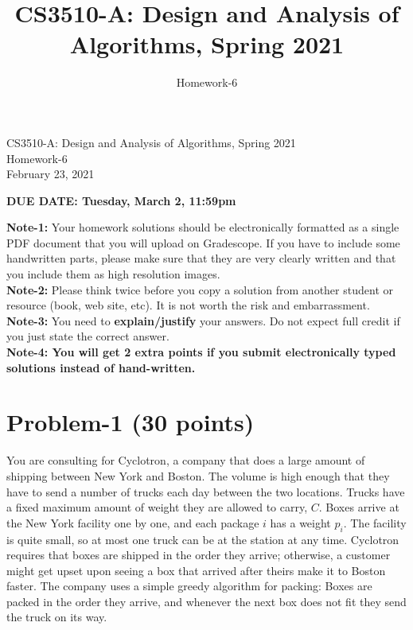 \documentclass[11pt]{article}
\title{CS3510-A: Design and Analysis of Algorithms, Spring 2021}
\author{Homework-6}
\begin{document}
\begin{center}
    \LARGE CS3510-A: Design and Analysis of Algorithms, Spring 2021 \\ \vspace{1em} 
    \large Homework-6 \\ \vspace{0.5em}
    February 23, 2021
\end{center}
\thispagestyle{empty}
\pagestyle{empty}

\noindent
\begin{center}
{\bf DUE DATE: Tuesday, March 2, 11:59pm}
\end{center}

\noindent
{\bf Note-1:} Your homework solutions should be electronically formatted as a single PDF document that you will upload on Gradescope. 
If you have to include some handwritten parts, please make sure that they are very clearly written and that you include them as high resolution images. \\

\noindent
{\bf Note-2:} Please think twice before you copy a solution from another student or resource (book, web site, etc). 
It is not worth the risk and embarrassment. \\

\noindent
{\bf Note-3:} You need to {\bf explain/justify} your answers. Do not expect full credit if you just state the correct answer. \\

\noindent
{\bf Note-4: You will get 2 extra points if you submit electronically typed solutions instead of hand-written.} 

\newpage
\section*{Problem-1 (30 points)}
You are consulting for Cyclotron, a company that does a large amount of shipping between New York and Boston. The volume is high enough that they have to send a number of trucks each day between the two locations. Trucks have a fixed maximum amount of weight they are allowed to carry, $C$. Boxes arrive at the New York facility one by one, and each package $i$ has a weight $p_i$. The facility is quite small, so at most one truck can be at the station at any time. Cyclotron requires that boxes are shipped in the order they arrive; otherwise, a customer might get upset upon seeing a box that arrived after theirs make it to Boston faster. The company uses a simple greedy algorithm for packing: Boxes are packed in the order they arrive, and whenever the next box does not fit they send the truck on its way.
\end{document}
